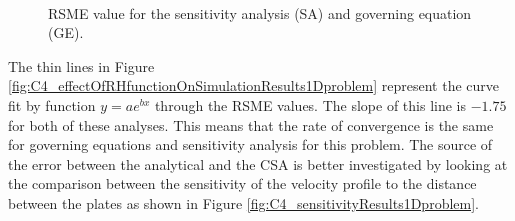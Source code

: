 \begin{figure}[H]
    \centering
    \\
    \caption{RSME value for the sensitivity analysis (SA) and governing equation (GE).}
    \label{fig:C4_effectOfNumberOfNodesOnSensitivityResults1Dproblem}
\end{figure}

The thin lines in Figure \ref{fig:C4_effectOfRHfunctionOnSimulationResults1Dproblem} represent the curve fit by function $y = ae^{bx}$ through the RSME values. The slope of this line is $-1.75$ for both of these analyses. This means that the rate of convergence is the same for governing equations and sensitivity analysis for this problem. The source of the error between the analytical and the CSA is better investigated by looking at the comparison between the sensitivity of the velocity profile to the distance between the plates as shown in Figure \ref{fig:C4_sensitivityResults1Dproblem}.

